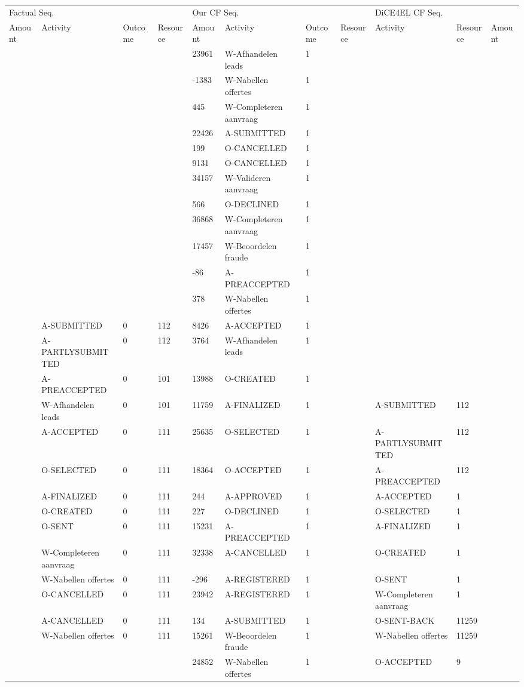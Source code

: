 \begin{tabular}{lllllllllll}
\toprule
\multicolumn{4}{l}{Factual Seq.} & \multicolumn{4}{l}{Our CF Seq.} & \multicolumn{3}{l}{DiCE4EL CF Seq.} \\
Amount & Activity & Outcome & Resource & Amount & Activity & Outcome & Resource & Activity & Resource & Amount \\
\midrule
 &  &  &  & 23961 & W-Afhandelen leads & 1 &  &  &  &  \\
 &  &  &  & -1383 & W-Nabellen offertes & 1 &  &  &  &  \\
 &  &  &  & 445 & W-Completeren aanvraag & 1 &  &  &  &  \\
 &  &  &  & 22426 & A-SUBMITTED & 1 &  &  &  &  \\
 &  &  &  & 199 & O-CANCELLED & 1 &  &  &  &  \\
 &  &  &  & 9131 & O-CANCELLED & 1 &  &  &  &  \\
 &  &  &  & 34157 & W-Valideren aanvraag & 1 &  &  &  &  \\
 &  &  &  & 566 & O-DECLINED & 1 &  &  &  &  \\
 &  &  &  & 36868 & W-Completeren aanvraag & 1 &  &  &  &  \\
 &  &  &  & 17457 & W-Beoordelen fraude & 1 &  &  &  &  \\
 &  &  &  & -86 & A-PREACCEPTED & 1 &  &  &  &  \\
 &  &  &  & 378 & W-Nabellen offertes & 1 &  &  &  &  \\
 & A-SUBMITTED & 0 & 112 & 8426 & A-ACCEPTED & 1 &  &  &  &  \\
 & A-PARTLYSUBMITTED & 0 & 112 & 3764 & W-Afhandelen leads & 1 &  &  &  &  \\
 & A-PREACCEPTED & 0 & 101 & 13988 & O-CREATED & 1 &  &  &  &  \\
 & W-Afhandelen leads & 0 & 101 & 11759 & A-FINALIZED & 1 &  & A-SUBMITTED & 112 &  \\
 & A-ACCEPTED & 0 & 111 & 25635 & O-SELECTED & 1 &  & A-PARTLYSUBMITTED & 112 &  \\
 & O-SELECTED & 0 & 111 & 18364 & O-ACCEPTED & 1 &  & A-PREACCEPTED & 112 &  \\
 & A-FINALIZED & 0 & 111 & 244 & A-APPROVED & 1 &  & A-ACCEPTED & 1 &  \\
 & O-CREATED & 0 & 111 & 227 & O-DECLINED & 1 &  & O-SELECTED & 1 &  \\
 & O-SENT & 0 & 111 & 15231 & A-PREACCEPTED & 1 &  & A-FINALIZED & 1 &  \\
 & W-Completeren aanvraag & 0 & 111 & 32338 & A-CANCELLED & 1 &  & O-CREATED & 1 &  \\
 & W-Nabellen offertes & 0 & 111 & -296 & A-REGISTERED & 1 &  & O-SENT & 1 &  \\
 & O-CANCELLED & 0 & 111 & 23942 & A-REGISTERED & 1 &  & W-Completeren aanvraag & 1 &  \\
 & A-CANCELLED & 0 & 111 & 134 & A-SUBMITTED & 1 &  & O-SENT-BACK & 11259 &  \\
 & W-Nabellen offertes & 0 & 111 & 15261 & W-Beoordelen fraude & 1 &  & W-Nabellen offertes & 11259 &  \\
 &  &  &  & 24852 & W-Nabellen offertes & 1 &  & O-ACCEPTED & 9 &  \\
\bottomrule
\end{tabular}
